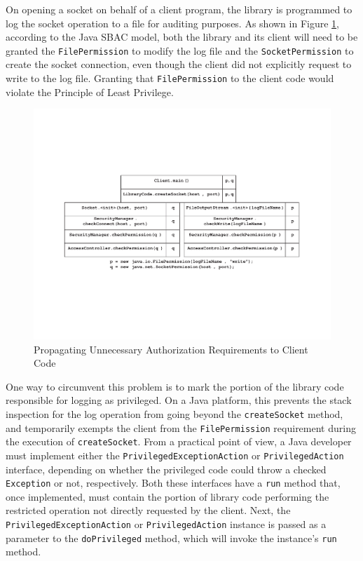 On opening a socket on behalf of a client program, the library is
programmed to log the socket operation to a file for auditing
purposes. As shown in Figure \ref{fig:NoDoPriv}, according to the
Java SBAC model, both the library and its client will need to be
granted the \verb"FilePermission" to modify the log file and the
\verb"SocketPermission" to create the socket connection, even
though the client did not explicitly request to write to the log
file. Granting that \texttt{FilePermission} to the client code
would violate the Principle of Least Privilege.
\begin{figure}[h]
	\centering
	\includegraphics[scale=0.4]{pistoia-figure1-eps-converted-to.pdf}
	\caption{Propagating Unnecessary Authorization Requirements to Client Code}
	\label{fig:NoDoPriv}
\end{figure}

One way to circumvent this problem is to mark the portion of the
library code responsible for logging as privileged. On a Java
platform, this prevents the stack inspection for the log operation
from going beyond the \texttt{createSocket} method, and
temporarily exempts the client from the \texttt{FilePermission}
requirement during the execution of \texttt{createSocket}. From a
practical point of view, a Java developer must implement either
the \verb"PrivilegedExceptionAction" or \verb"PrivilegedAction"
interface, depending on whether the privileged code could throw a
checked \verb"Exception" or not, respectively.  Both these
interfaces have a \verb"run" method that, once implemented, must
contain the portion of library code performing the restricted
operation not directly requested by the client. Next, the
\verb"PrivilegedExceptionAction" or \verb"PrivilegedAction"
instance is passed as a parameter to the \verb"doPrivileged"
method, which will invoke the instance's \texttt{run} method.

